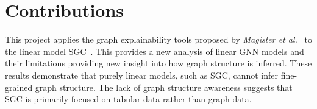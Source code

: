 %
%

\section{Contributions}

This project applies the graph explainability tools proposed by \textit{Magister et al.}~\cite{magister2021gcexplainer} to the linear model SGC~\cite{wu2019simplifying}.
This provides a new analysis of linear GNN models and their limitations providing new insight into how graph structure is inferred.
These results demonstrate that purely linear models, such as SGC, cannot infer fine-grained graph structure.
The lack of graph structure awareness suggests that SGC is primarily focused on tabular data rather than graph data.

